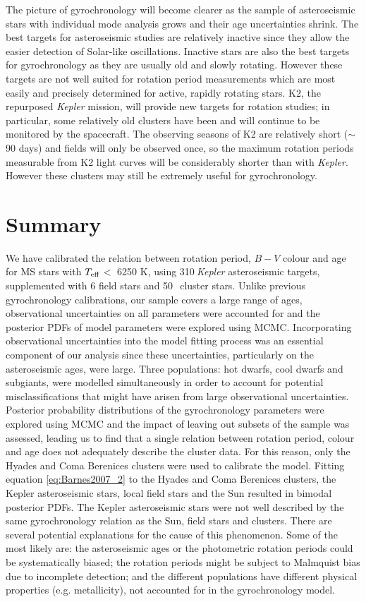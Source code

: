 \documentclass[useAMS, usenatbib]{mn2e}
\newcommand{\teff}{$T_{\rm{eff}}$}
\newcommand{\nastero}{310}
\newcommand{\nHC}{50~}
\begin{document}
The picture of gyrochronology will become clearer as the sample of
asteroseismic stars with individual mode analysis grows and their age
uncertainties shrink.
The best targets for asteroseismic studies are relatively inactive since they
allow the easier detection of Solar-like oscillations.
Inactive stars are also the best targets for gyrochronology as they are
usually old and slowly rotating.
However these targets are not well suited for
rotation period measurements which are most easily and precisely determined
for active, rapidly rotating stars.
K2, the repurposed {\it Kepler} mission, will provide new targets for rotation
studies; in particular, some relatively old clusters have been and will
continue to be monitored by the spacecraft.
The observing seasons of K2 are relatively short ($\sim$ 90 days) and fields
will only be observed once, so the maximum rotation periods measurable from
K2 light curves will be considerably shorter than with {\it Kepler}.
However these clusters may still be extremely useful for gyrochronology.

\section{Summary}
\label{sec:conclusions}

We have calibrated the relation between rotation period, $B-V$ colour and age
for MS stars with \teff$<$ 6250 K, using \nastero$~${\it Kepler} asteroseismic
targets, supplemented with 6 field stars and \nHC$~$cluster stars.
Unlike previous gyrochronology calibrations, our sample covers a large range
of ages, observational uncertainties on all parameters were accounted for and
the posterior PDFs of model parameters were explored using MCMC.
Incorporating observational uncertainties into the model fitting process was
an essential component of our analysis since these uncertainties, particularly
on the asteroseismic ages, were large.
Three populations: hot dwarfs, cool dwarfs and subgiants, were modelled
simultaneously in order to account for potential misclassifications that
might have arisen from large observational uncertainties.
Posterior probability distributions of the gyrochronology parameters were
explored using MCMC and the impact of leaving out subsets of the sample was
assessed, leading us to find that a single relation between rotation period,
colour and age does not adequately describe the cluster data.
For this reason, only the Hyades and Coma Berenices clusters were used to
calibrate the model.
Fitting equation \ref{eq:Barnes2007_2} to the Hyades and Coma Berenices
clusters, the Kepler asteroseismic stars, local field stars and the Sun
resulted in bimodal posterior PDFs.
The Kepler asteroseismic stars were not well described by the same
gyrochronology relation as the Sun, field stars and clusters.
There are several potential explanations for the cause of this phenomenon.
Some of the most likely are: the asteroseismic ages or the photometric
rotation periods could be systematically biased; the rotation periods might be
subject to Malmquist bias due to incomplete detection; and the different
populations have different physical properties (e.g. metallicity), not
accounted for in the gyrochronology model.
\end{document}
